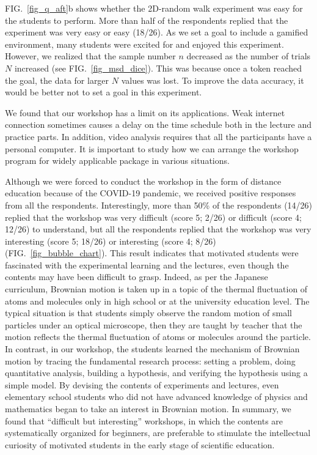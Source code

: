 \documentclass[10pt, aps, prb, preprint, longbibliography, superscriptaddress]{revtex4-2}
\newcommand{\figref}[1]{FIG.~\ref{#1}}
\begin{document}
\figref{fig_q_aft}b shows whether the 2D-random walk experiment was easy for the students to perform.
More than half of the respondents replied that the experiment was very easy or easy (18/26).
As we set a goal to include a gamified environment,
many students were excited for and enjoyed this experiment.
However, we realized that the sample number $n$ decreased
as the number of trials $N$ increased (see \figref{fig_msd_dice}).
This was because once a token reached the goal, the data for larger $N$ values was lost.
To improve the data accuracy, it would be better not to set a goal in this experiment.

We found that our workshop has a limit on its applications.
Weak internet connection sometimes causes a delay on the time schedule both in the lecture and practice parts.
In addition, video analysis requires that all the participants have a personal computer.
It is important to study how we can arrange the workshop program for widely applicable package
in various situations.

Although we were forced to conduct the workshop in the form of distance education
because of the COVID-19 pandemic,
we received positive responses from all the respondents.
Interestingly, more than 50\% of the respondents (14/26) replied
that the workshop was very difficult (score 5; 2/26) or difficult (score 4; 12/26) to understand,
but all the respondents replied that the workshop was very interesting (score 5; 18/26)
or interesting (score 4; 8/26) (\figref{fig_bubble_chart}).
This result indicates that motivated students were fascinated with the experimental learning and the lectures,
even though the contents may have been difficult to grasp.
%
Indeed, as per the Japanese curriculum, Brownian motion is taken up in a topic
of the thermal fluctuation of atoms and molecules only in high school
or at the university education level.
The typical situation is that students simply observe the random motion of small particles
under an optical microscope,
then they are taught by teacher that the motion reflects
the thermal fluctuation of atoms or molecules around the particle.
In contrast, in our workshop, the students learned the mechanism of Brownian motion
by tracing the fundamental research process:
setting a problem, doing quantitative analysis, building a hypothesis, and verifying the hypothesis
using a simple model.
By devising the contents of experiments and lectures, even elementary school students
who did not have advanced knowledge of physics and mathematics began to take an interest in Brownian motion.
In summary, we found that ``difficult but interesting'' workshops,
in which the contents are systematically organized for beginners,
are preferable to stimulate the intellectual curiosity of motivated students
in the early stage of scientific education.
\end{document}
